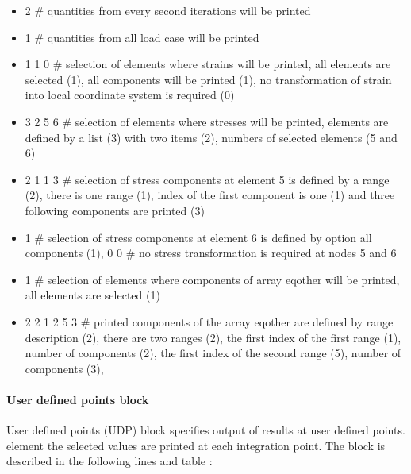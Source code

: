 \begin{itemize}
\item[]
2 \# quantities from every second iterations will be printed
\item[]
1 \# quantities from all load case will be printed
\item[]
1 1 0 \# selection of elements where strains will be printed, all elements are selected (1),
all components will be printed (1), no transformation of strain into
local coordinate system is required (0)
\item[]
3 2 5 6 \# selection of elements where stresses will be printed, elements are defined
by a list (3) with two items (2), numbers of selected elements (5 and 6)
\item[]
2 1 1 3 \# selection of stress components at element 5 is defined by a range (2), there is one range (1),
index of the first component is one (1) and three following components are printed (3)
\item[]
1 \# selection of stress components at element 6 is defined by option all components (1),
0 0 \# no stress transformation is required at nodes 5 and 6
\item[]
1 \# selection of elements where components of array eqother will be printed, all elements are selected (1)
\item[]
2 2 1 2 5 3 \# printed components of the array eqother are defined by range description (2), there are two
ranges (2), the first index of the first range (1), number of components (2),
the first index of the second range (5), number of components (3),
\end{itemize}






\paragraph{User defined points block}
User defined points (UDP) block specifies output of results at user defined points.
element the selected values are printed at each integration point.
The block is described in the  following lines and table :

